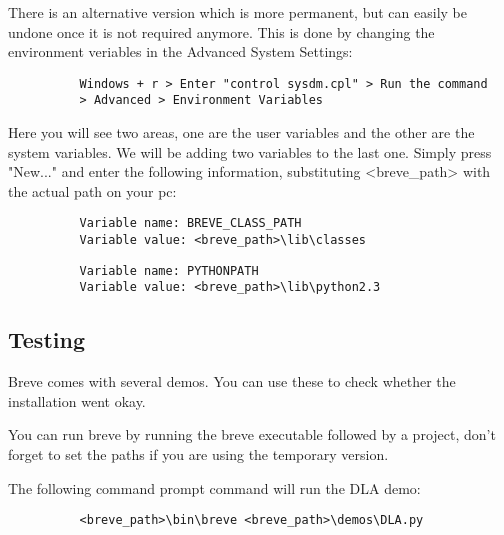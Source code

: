 	There is an alternative version which is more permanent, but can easily be undone once it is not required anymore. This is done by changing the environment veriables in the Advanced System Settings:
	\begin{verbatim}
		  Windows + r > Enter "control sysdm.cpl" > Run the command
		  > Advanced > Environment Variables
	\end{verbatim}

	Here you will see two areas, one are the user variables and the other are the system variables. We will be adding two variables to the last one. Simply press "New..." and enter the following information, substituting <breve\_path> with the actual path on your pc:
	\begin{verbatim}
		  Variable name: BREVE_CLASS_PATH
		  Variable value: <breve_path>\lib\classes
	\end{verbatim}
	\begin{verbatim}
		  Variable name: PYTHONPATH
		  Variable value: <breve_path>\lib\python2.3
	\end{verbatim}

\subsection{Testing}
	Breve comes with several demos. You can use these to check whether the installation went okay. 

	You can run breve by running the breve executable followed by a project, don't forget to set the paths if you are using the temporary version.

	The following command prompt command will run the DLA demo:
	\begin{verbatim}
		  <breve_path>\bin\breve <breve_path>\demos\DLA.py
	\end{verbatim}

